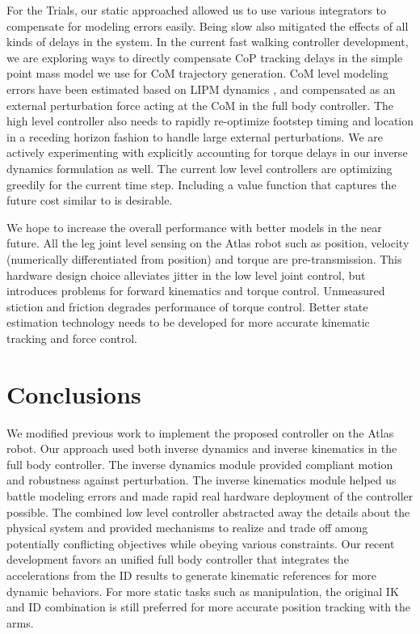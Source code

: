 \documentclass{ws-ijhr}
\begin{document}
For the Trials, our static approached allowed us to use various integrators to 
compensate for modeling errors easily. 
Being slow also mitigated the effects of all kinds of delays in the system. 
In the current fast walking controller development, we are exploring ways to 
directly compensate CoP tracking delays in the simple point mass model we use 
for CoM trajectory generation. 
CoM level modeling errors have been estimated based on LIPM 
dynamics \cite{benx_proposal}, and compensated as an external perturbation 
force acting at the CoM \cite{sfeng_proposal} in the full body controller.
The high level controller also needs to rapidly re-optimize footstep timing and
location in a receding horizon fashion to handle large external perturbations. 
We are actively experimenting with explicitly accounting for torque delays in 
our inverse dynamics formulation as well. 
The current low level controllers are optimizing greedily for the current 
time step. 
Including a value function that captures the future cost similar to 
\cite{scott_qp} is desirable. 

We hope to increase the overall performance with better models in the near future. 
All the leg joint level sensing on the Atlas robot such as position, velocity 
(numerically differentiated from position) and torque are pre-transmission. 
This hardware design choice alleviates jitter in the low level joint control, 
but introduces problems for forward kinematics and torque control. 
Unmeasured stiction and friction degrades performance of torque control. 
Better state estimation technology needs to be developed for more accurate 
kinematic tracking and force control. 



\section{Conclusions}
\label{sec:conclusion}
We modified previous work to implement the proposed controller on the Atlas 
robot. 
Our approach used both inverse dynamics and inverse kinematics in the full body 
controller. 
The inverse dynamics module provided compliant motion and robustness against 
perturbation. 
The inverse kinematics module helped us battle modeling errors and made rapid 
real hardware deployment of the controller possible.
The combined low level controller abstracted away the details about the physical 
system and provided mechanisms to realize and trade off among potentially 
conflicting objectives while obeying various constraints. 
Our recent development favors an unified full body controller that integrates 
the accelerations from the ID results to generate kinematic references for more 
dynamic behaviors. 
For more static tasks such as manipulation, the original IK and ID combination 
is still preferred for more accurate position tracking with the arms.
\end{document}

